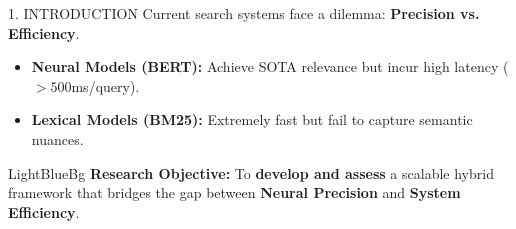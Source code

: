 \documentclass[10pt]{article}
\begin{document}
\begin{center}
    \noindent
    \begin{minipage}[t]{0.96\paperwidth}
        \vspace{0pt}
        
        \begin{minipage}[t]{0.4\linewidth}
            \vspace{0pt}
            
            \begin{contentbox}{1. INTRODUCTION}
                \small 
                Current search systems face a dilemma: \textbf{Precision vs. Efficiency}.
                \vspace{0.05cm}
                \begin{itemize}
                    \setlength\itemsep{0pt}
                    \item \textbf{Neural Models (BERT):} Achieve SOTA relevance but incur high latency ($>500$ms/query).
                    \item \textbf{Lexical Models (BM25):} Extremely fast but fail to capture semantic nuances.
                \end{itemize}
                \vspace{0.05cm}
                \begin{alertbox}{LightBlueBg}
                    \textbf{\textcolor{AccentBlue}{Research Objective:}} To \textbf{develop and assess} a scalable hybrid framework that bridges the gap between \textbf{Neural Precision} and \textbf{System Efficiency}.
                \end{alertbox}
            \end{contentbox}
            
            \vspace{1.2cm}
            

\end{minipage}
\end{minipage}
\end{center}
\end{document}
